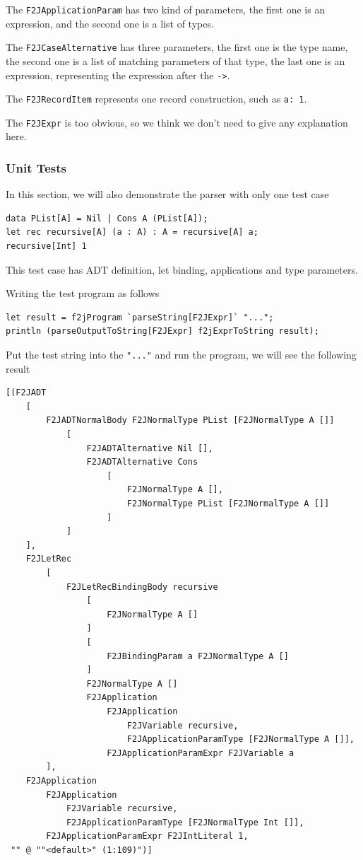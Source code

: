 The \texttt{F2JApplicationParam} has two kind of parameters, the first one is an expression, and the second one is a list of types.

The \texttt{F2JCaseAlternative} has three parameters, the first one is the type name, the second one is a list of matching parameters of that type, the last one is an expression, representing the expression after the \texttt{-\textgreater}.

The \texttt{F2JRecordItem} represents one record construction, such as \texttt{a: 1}.

The \texttt{F2JExpr} is too obvious, so we think we don't need to give any explanation here.

\subsubsection{Unit Tests}

In this section, we will also demonstrate the parser with only one test case

\begin{lstlisting}
data PList[A] = Nil | Cons A (PList[A]);
let rec recursive[A] (a : A) : A = recursive[A] a;
recursive[Int] 1
\end{lstlisting}

This test case has ADT definition, let binding, applications and type parameters.

Writing the test program as follows

\begin{lstlisting}
let result = f2jProgram `parseString[F2JExpr]` "...";
println (parseOutputToString[F2JExpr] f2jExprToString result);
\end{lstlisting}

Put the test string into the \texttt{"..."} and run the program, we will see the following result

\begin{lstlisting}
[(F2JADT
    [
        F2JADTNormalBody F2JNormalType PList [F2JNormalType A []]
            [
                F2JADTAlternative Nil [],
                F2JADTAlternative Cons
                    [
                        F2JNormalType A [],
                        F2JNormalType PList [F2JNormalType A []]
                    ]
            ]
    ],
    F2JLetRec
        [
            F2JLetRecBindingBody recursive
                [
                    F2JNormalType A []
                ]
                [
                    F2JBindingParam a F2JNormalType A []
                ]
                F2JNormalType A []
                F2JApplication
                    F2JApplication
                        F2JVariable recursive,
                        F2JApplicationParamType [F2JNormalType A []],
                    F2JApplicationParamExpr F2JVariable a
        ],
    F2JApplication
        F2JApplication
            F2JVariable recursive,
            F2JApplicationParamType [F2JNormalType Int []],
        F2JApplicationParamExpr F2JIntLiteral 1,
 "" @ ""<default>" (1:109)")]
\end{lstlisting}

